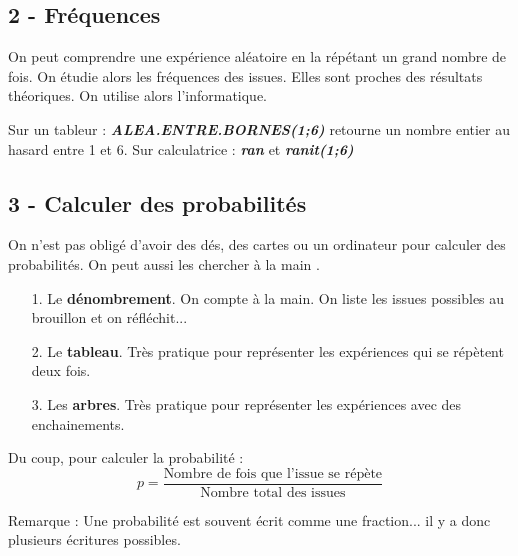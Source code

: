 \documentclass[12pt]{article}
\begin{document}
\subsection*{2 - Fréquences}

On peut comprendre une expérience aléatoire en la répétant un grand nombre de fois. On étudie alors les fréquences des issues. Elles sont proches des résultats théoriques. On utilise alors l'informatique.

Sur un tableur : \textit{\textbf{ALEA.ENTRE.BORNES(1;6)}} retourne un nombre entier au hasard entre 1 et 6.
Sur calculatrice : \textit{\textbf{ran}} et \textit{\textbf{ranit(1;6)}}


\subsection*{3 - Calculer des probabilités}

On n'est pas obligé d'avoir des dés, des cartes ou un ordinateur pour calculer des probabilités. On peut aussi les chercher \og à la main \fg . 

\begin{enumerate}
\item[1.] Le \textbf{dénombrement}. On compte à la main. On liste les issues possibles au brouillon et on réfléchit...
\item[2.] Le \textbf{tableau}. Très pratique pour représenter les expériences qui se répètent deux fois.
\item[3.] Les \textbf{arbres}. Très pratique pour représenter les expériences avec des enchainements.
\end{enumerate}

Du coup, pour calculer la probabilité :
$$p = \dfrac{\text{Nombre de fois que l'issue se répète}}{\text{Nombre total des issues}}$$

Remarque : Une probabilité est souvent écrit comme une fraction... il y a donc plusieurs écritures possibles.
\end{document}
